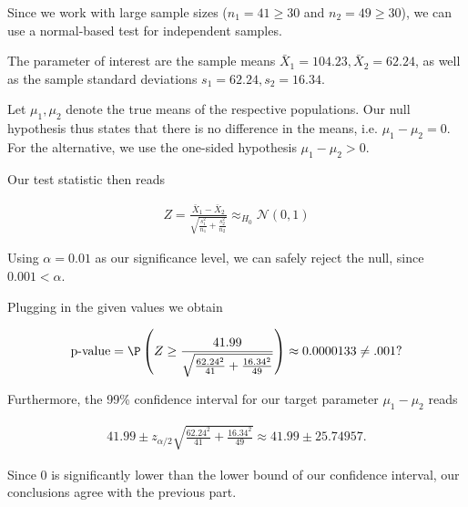 \begin{solution}

Since we work with large sample sizes ($n_1 = 41 \geq 30$ and $n_2 = 49 \geq 30$),
we can use a normal-based test for independent samples.

The parameter of interest are the sample means $\bar{X}_1 = 104.23, \bar{X}_2 = 62.24$,
as well as the sample standard deviations $s_{1} = 62.24, s_{2} = 16.34$.

Let $\mu_1, \mu_2$ denote the true means of the respective populations.
Our null hypothesis thus states that there is no difference in the means,
i.e. $\mu_1 - \mu_2 = 0$.
For the alternative, we use the one-sided hypothesis $\mu_1 - \mu_2 > 0$.

Our test statistic then reads

\begin{align*}
    Z = \frac{\bar{X}_1 - \bar{X}_2}{\sqrt{\frac{s_1^2}{n_1} + \frac{s_2^2}{n_2}}}
    \approx_{H_0} \mathcal{N}(0,1)
\end{align*}

Using $\alpha = 0.01$ as our significance level, we can safely reject the null, since $0.001 < \alpha$.


Plugging in the given values we obtain 

\begin{align*}
    \text{p-value} = \P\left(Z \geq \frac{41.99}{\sqrt{\frac{62.24^2}{41} + \frac{16.34^2}{49}}}\right)
    \approx 0.0000133 \neq .001 ?
\end{align*}

Furthermore, the 99\% confidence interval for our target parameter $\mu_1 - \mu_2$ reads

\begin{align*}
    41.99 \pm z_{\alpha/2} \sqrt{\frac{62.24^2}{41} + \frac{16.34^2}{49}}
    \approx 41.99 \pm 25.74957.
\end{align*}

Since $0$ is significantly lower than the lower bound of our confidence interval,
our conclusions agree with the previous part.
\end{solution}

